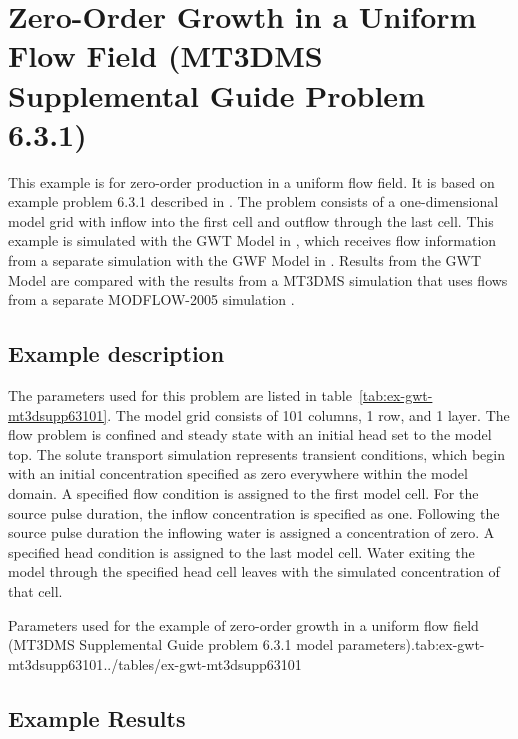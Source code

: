\section{Zero-Order Growth in a Uniform Flow Field (MT3DMS Supplemental Guide Problem 6.3.1)}

This example is for zero-order production in a uniform flow field.  It is based on example problem 6.3.1 described in \cite{zheng2010mt3dmsv5.3}.  The problem consists of a one-dimensional model grid with inflow into the first cell and outflow through the last cell.  This example is simulated with the GWT Model in \mf, which receives flow information from a separate simulation with the GWF Model in \mf.  Results from the GWT Model are compared with the results from a MT3DMS simulation \citep{zheng1990mt3d} that uses flows from a separate MODFLOW-2005 simulation \citep{modflow2005}.  

\subsection{Example description}

The parameters used for this problem are listed in table~\ref{tab:ex-gwt-mt3dsupp63101}.  The model grid consists of 101 columns, 1 row, and 1 layer.  The flow problem is confined and steady state with an initial head set to the model top.  The solute transport simulation represents transient conditions, which begin with an initial concentration specified as zero everywhere within the model domain.  A specified flow condition is assigned to the first model cell.  For the source pulse duration, the inflow concentration is specified as one.  Following the source pulse duration the inflowing water is assigned a concentration of zero.  A specified head condition is assigned to the last model cell.  Water exiting the model through the specified head cell leaves with the simulated concentration of that cell.

\begin{StandardTable}{Parameters used for the example of zero-order growth in a uniform flow field (MT3DMS Supplemental Guide problem 6.3.1 model parameters).}{tab:ex-gwt-mt3dsupp63101}{../tables/ex-gwt-mt3dsupp63101}
\end{StandardTable}

\subsection{Example Results}

